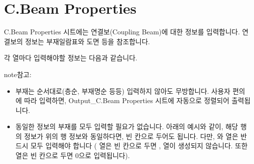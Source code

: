 \documentclass[a4paper,11pt,korean,openany,oneside]{sphinxmanual}
\begin{document}
\section{C.Beam Properties}
\label{\detokenize{2_c_beam_properties:c-beam-properties}}\label{\detokenize{2_c_beam_properties::doc}}
\sphinxAtStartPar
C.Beam Properties 시트에는 연결보(Coupling Beam)에 대한 정보를 입력합니다.
연결보의 정보는 부재일람표와 도면 등을 참조합니다.

\sphinxAtStartPar
각 열마다 입력해야할 정보는 다음과 같습니다.

\begin{sphinxadmonition}{note}{참고:}\begin{itemize}
\item {} 
\sphinxAtStartPar
부재는 순서대로(층순, 부재명순 등등) 입력하지 않아도 무방합니다.
사용자 편의에 따라 입력하면, Output\_C.Beam Properties 시트에 자동으로 정렬되어 출력됩니다.

\item {} 
\sphinxAtStartPar
동일한 정보의 부재를 모두 입력할 필요가 없습니다. 아래의 예시와 같이, 해당 행의 정보가 위의 행 정보와 동일하다면, 빈 칸으로 두어도 됩니다.
다만, 와  열은 반드시 모두 입력해야 합니다
( 열은 빈 칸으로 두면 ,  열이 생성되지 않습니다. 또한  열은 빈 칸으로 두면 0으로 입력됩니다).

\begin{figure}[H]
\centering

\noindent{}
\end{figure}

\end{itemize}
\end{sphinxadmonition}
\end{document}
